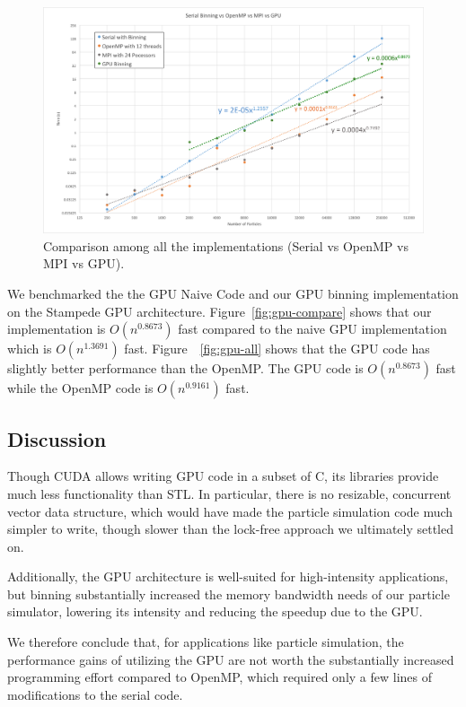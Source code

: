 \documentclass[12pt]{article}
\begin{document}
\begin{figure}
  \centering
  \includegraphics[width=\textwidth]{graphs/all.png}
  \caption{Comparison among all the implementations (Serial vs OpenMP vs MPI vs GPU).}
  \label{fig:all}
\end{figure}

We benchmarked the the GPU Naive Code and our GPU binning implementation on the Stampede GPU architecture. Figure~\ref{fig:gpu-compare} shows that our implementation is $O(n^{0.8673})$ fast compared to the naive GPU implementation which is $O(n^{1.3691})$ fast. Figure~~\ref{fig:gpu-all} shows that the GPU code has slightly better performance than the OpenMP. The GPU code is $O(n^{0.8673})$ fast while the OpenMP code is $O(n^{0.9161})$ fast. 

\subsection{Discussion}

Though CUDA allows writing GPU code in a subset of C, its libraries provide much less functionality than STL. In particular, there is no resizable, concurrent vector data structure, which would have made the particle simulation code much simpler to write, though slower than the lock-free approach we ultimately settled on.

Additionally, the GPU architecture is well-suited for high-intensity applications, but binning substantially increased the memory bandwidth needs of our particle simulator, lowering its intensity and reducing the speedup due to the GPU.

We therefore conclude that, for applications like particle simulation, the performance gains of utilizing the GPU are not worth the substantially increased programming effort compared to OpenMP, which required only a few lines of modifications to the serial code.


%
\end{document}
